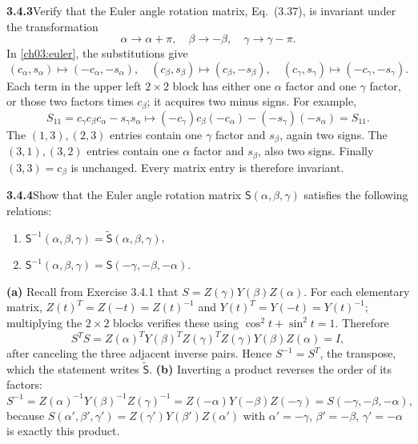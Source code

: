 \par\bigskip
\noindent\textbf{3.4.3}\quad Verify that the Euler angle rotation matrix,
Eq.~(3.37), is invariant under the transformation
\[
\alpha\to\alpha+\pi,\quad\beta\to-\beta,\quad\gamma\to\gamma-\pi.
\]
\solution
In \eqref{ch03:euler}, the substitutions give
\[
(c_\alpha,s_\alpha)\mapsto(-c_\alpha,-s_\alpha),\quad
(c_\beta,s_\beta)\mapsto(c_\beta,-s_\beta),\quad
(c_\gamma,s_\gamma)\mapsto(-c_\gamma,-s_\gamma).
\]
Each term in the upper left $2\times2$ block has either one
$\alpha$ factor and one $\gamma$ factor, or those two factors times
$c_\beta$; it acquires two minus signs. For example,
\[
S_{11}=c_\gamma c_\beta c_\alpha-s_\gamma s_\alpha
\mapsto(-c_\gamma)c_\beta(-c_\alpha)-(-s_\gamma)(-s_\alpha)=S_{11}.
\]
The $(1,3),(2,3)$ entries contain one $\gamma$ factor and $s_\beta$,
again two signs. The $(3,1),(3,2)$ entries contain one $\alpha$
factor and $s_\beta$, also two signs. Finally $(3,3)=c_\beta$ is
unchanged. Every matrix entry is therefore invariant.

\par\bigskip
\noindent\textbf{3.4.4}\quad Show that the Euler angle rotation matrix
$\mathsf{S}(\alpha,\beta,\gamma)$ satisfies the following relations:
\begin{enumerate}
\item[(a)] $\mathsf{S}^{-1}(\alpha,\beta,\gamma)
  =\tilde{\mathsf{S}}(\alpha,\beta,\gamma)$,
\item[(b)] $\mathsf{S}^{-1}(\alpha,\beta,\gamma)
  =\mathsf{S}(-\gamma,-\beta,-\alpha)$.
\end{enumerate}
\solution
\textbf{(a)} Recall from Exercise 3.4.1 that
$S=Z(\gamma)Y(\beta)Z(\alpha)$. For each elementary matrix,
$Z(t)^T=Z(-t)=Z(t)^{-1}$ and $Y(t)^T=Y(-t)=Y(t)^{-1}$;
multiplying the $2\times2$ blocks verifies these using
$\cos^2t+\sin^2t=1$.
Therefore
\[
S^TS=
Z(\alpha)^TY(\beta)^TZ(\gamma)^TZ(\gamma)Y(\beta)Z(\alpha)=I,
\]
after canceling the three adjacent inverse pairs. Hence $S^{-1}=S^T$,
the transpose, which the statement writes $\tilde{\mathsf S}$.
\textbf{(b)} Inverting a product reverses the order of its factors:
\[
S^{-1}=Z(\alpha)^{-1}Y(\beta)^{-1}Z(\gamma)^{-1}
=Z(-\alpha)Y(-\beta)Z(-\gamma)
=\boxed{S(-\gamma,-\beta,-\alpha)},
\]
because $S(\alpha',\beta',\gamma')=Z(\gamma')Y(\beta')Z(\alpha')$ with
$\alpha'=-\gamma$, $\beta'=-\beta$, $\gamma'=-\alpha$ is exactly this
product.

